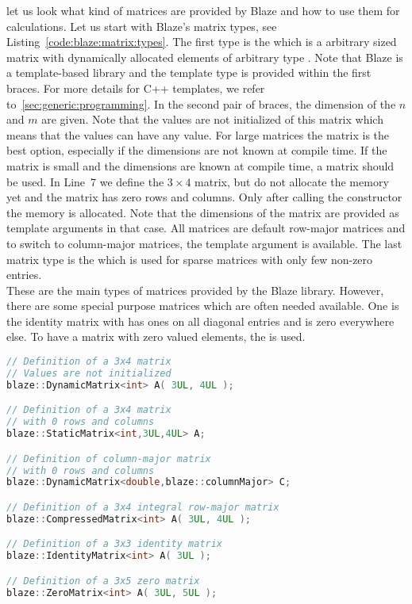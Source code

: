 \documentclass[11pt,fleqn]{book} %
\begin{document}
let us look what kind of matrices are provided by Blaze and how to use them for calculations. Let us start with Blaze's matrix types, see Listing~\ref{code:blaze:matrix:types}. The first type is the  which is a arbitrary sized matrix with dynamically allocated elements of arbitrary type . Note that Blaze is a template-based library and the template type is provided within the first braces. For more details for C++ templates, we refer to~\ref{sec:generic:programming}. In the second pair of braces, the dimension of the $n$ and $m$ are given. Note that the values are not initialized of this matrix which means that the values can have any value. For large matrices the  matrix is the best option, especially if the dimensions are not known at compile time. If the matrix is small and the dimensions are known at compile time, a  matrix should be used. In Line~7 we define the $3\times 4$ matrix, but do not allocate the memory yet and the matrix has zero rows and columns. Only after calling the constructor the memory is allocated. Note that the dimensions of the matrix are provided as template arguments in that case. All matrices are default row-major matrices and to switch to column-major matrices, the template argument  is available. The last matrix type is the  which is used for sparse matrices with only few non-zero entries.\\

These are the main types of matrices provided by the Blaze library. However, there are some special purpose matrices which are often needed available. One is the identity matrix  with has ones on all diagonal entries and is zero everywhere else. To have a matrix with zero valued elements, the  is used.
 
\begin{lstlisting}[language=c++,caption={Blaze matrix types.\label{code:blaze:matrix:types}},float,floatplacement=tb]
// Definition of a 3x4 matrix 
// Values are not initialized
blaze::DynamicMatrix<int> A( 3UL, 4UL );

// Definition of a 3x4 matrix
// with 0 rows and columns
blaze::StaticMatrix<int,3UL,4UL> A;

// Definition of column-major matrix
// with 0 rows and columns
blaze::DynamicMatrix<double,blaze::columnMajor> C;

// Definition of a 3x4 integral row-major matrix
blaze::CompressedMatrix<int> A( 3UL, 4UL );

// Definition of a 3x3 identity matrix
blaze::IdentityMatrix<int> A( 3UL );

// Definition of a 3x5 zero matrix
blaze::ZeroMatrix<int> A( 3UL, 5UL );
\end{lstlisting}
\end{document}

